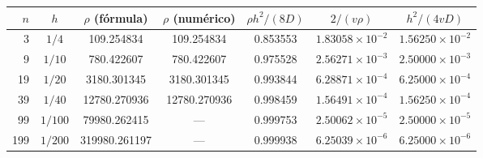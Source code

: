 \begin{tabular}{rcccccc}\toprule
$n$ & $h$ & $\rho$ (fórmula) & $\rho$ (numérico) & $\rho h^2/(8D)$ & $2/(v\rho)$ & $h^2/(4vD)$\\\midrule
3 & $1/4$ & 109.254834 & 109.254834 & 0.853553 & $1.83058\times10^{-2}$ & $1.56250\times10^{-2}$\\
9 & $1/10$ & 780.422607 & 780.422607 & 0.975528 & $2.56271\times10^{-3}$ & $2.50000\times10^{-3}$\\
19 & $1/20$ & 3180.301345 & 3180.301345 & 0.993844 & $6.28871\times10^{-4}$ & $6.25000\times10^{-4}$\\
39 & $1/40$ & 12780.270936 & 12780.270936 & 0.998459 & $1.56491\times10^{-4}$ & $1.56250\times10^{-4}$\\
99 & $1/100$ & 79980.262415 & --- & 0.999753 & $2.50062\times10^{-5}$ & $2.50000\times10^{-5}$\\
199 & $1/200$ & 319980.261197 & --- & 0.999938 & $6.25039\times10^{-6}$ & $6.25000\times10^{-6}$\\
\bottomrule
\end{tabular}
